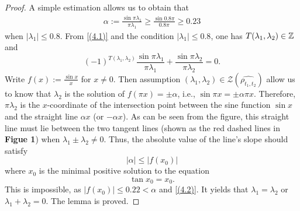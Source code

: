 \documentclass[12pt,psfig,reqno]{amsart}
\numberwithin{equation}{section}
\theoremstyle{plain}
\begin{document}
\begin{proof}
A simple estimation allows us to obtain that \begin{align}\label{(4.2)}
\alpha:=\frac{\sin\pi\lambda_1}{\pi\lambda_1}\geq \frac{\sin0.8\pi}{0.8\pi}\geq 0.23
\end{align}
 when $|\lambda_1|\leq 0.8$. 
From \eqref{(4.1)} and the condition $|\lambda_1|\leq0.8$, one has 
$T(\lambda_1,\lambda_2)\in\Bbb Z$ and $$
(-1)^{	T(\lambda_1,\lambda_2)}\frac{\sin\pi\lambda_1}{\pi\lambda_1}+\frac{\sin\pi\lambda_2}{\pi\lambda_2}=0.
$$
Write $f(x):=	\frac{\sin x}{ x}$ for $x\neq0$. 
Then assumption $(\lambda_1,\lambda_2)\in\mathcal{Z}(\widehat{\rho_{t_1,t_2}})$ allow us to know that $\lambda_2$ is the solution of $f(\pi x)=\pm\alpha$, i.e., $\sin\pi x=\pm\alpha \pi x$. 
Therefore, $\pi\lambda_2$ is the $x$-coordinate of the intersection point between the sine function $\sin x$ and the straight line $\alpha x$ (or $-\alpha x$). As can be seen from the figure, this straight line must lie between the two tangent lines (shown as the red dashed lines in \textbf{Figue 1}) when $\lambda_1\pm\lambda_2\neq0$. Thus, the absolute value of the line's slope should satisfy
\begin{equation*}
	|\alpha| \leq |f(x_0)|
\end{equation*}
where $x_0$ is the minimal positive solution to the equation
\begin{equation*}
	\tan x_0 = x_0.
\end{equation*}
This is impossible, as $|f(x_0)|\leq 0.22<\alpha$ and \eqref{(4.2)}. 
It yields that $\lambda_1=\lambda_2$ or $\lambda_1+\lambda_2=0$.
The lemma is proved. 
\end{proof}
\bigskip
{}
\end{document}
